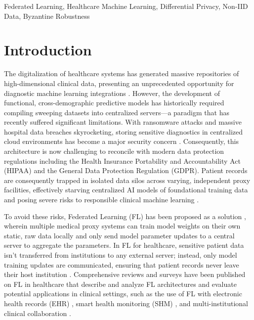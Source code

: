 \documentclass[conference]{IEEEtran}
\begin{document}
\begin{IEEEkeywords}
Federated Learning, Healthcare Machine Learning, Differential Privacy, Non-IID Data, Byzantine Robustness
\end{IEEEkeywords}

\section{Introduction}
The digitalization of healthcare systems has generated massive repositories of high-dimensional clinical data, presenting an unprecedented opportunity for diagnostic machine learning integrations \cite{nguyen2022federated}. However, the development of functional, cross-demographic predictive models has historically required compiling sweeping datasets into centralized servers---a paradigm that has recently suffered significant limitations. With ransomware attacks and massive hospital data breaches skyrocketing, storing sensitive diagnostics in centralized cloud environments has become a major security concern \cite{mothukuri2021survey}. Consequently, this architecture is now challenging to reconcile with modern data protection regulations including the Health Insurance Portability and Accountability Act (HIPAA) and the General Data Protection Regulation (GDPR). Patient records are consequently trapped in isolated data silos across varying, independent proxy facilities, effectively starving centralized AI models of foundational training data and posing severe risks to responsible clinical machine learning \cite{price2019privacy, wiens2019do}.

To avoid these risks, Federated Learning (FL) has been proposed as a solution \cite{mcmahan2017communication}, wherein multiple medical proxy systems can train model weights on their own static, raw data locally and only send model parameter updates to a central server to aggregate the parameters. In FL for healthcare, sensitive patient data isn't transferred from institutions to any external server; instead, only model training updates are communicated, ensuring that patient records never leave their host institution \cite{kairouz2021advances}. Comprehensive reviews and surveys have been published on FL in healthcare that describe and analyze FL architectures and evaluate potential applications in clinical settings, such as the use of FL with electronic health records (EHR) \cite{xu2021federated}, smart health monitoring (SHM) \cite{nguyen2022federated}, and multi-institutional clinical collaboration \cite{antunes2022federated, sheller2020federated}.
\end{document}
